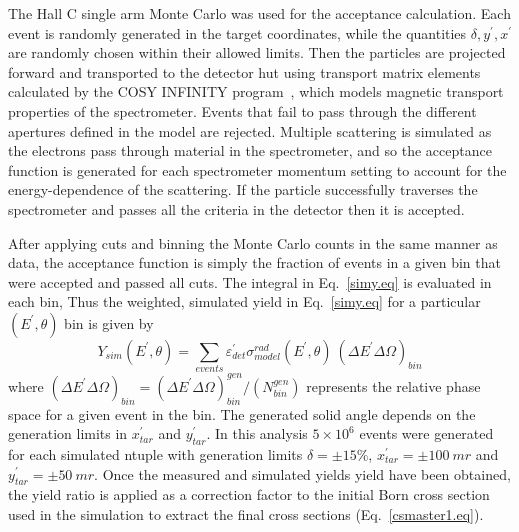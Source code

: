 


The Hall C single arm Monte Carlo was used for the acceptance calculation.
Each event is randomly generated in the target coordinates, while the
quantities $\delta, y^{'}, x^{'}$ are randomly chosen within their allowed
limits. Then the particles are projected forward and transported to the
detector hut using transport matrix elements calculated by the COSY INFINITY
program~\cite{berz_cosy}, which models magnetic transport properties of the
spectrometer. Events that fail to pass through the different apertures defined
in the model are rejected.  Multiple scattering is simulated as the electrons
pass through material in the spectrometer, and so the acceptance function
is generated for each spectrometer momentum setting to account for the
energy-dependence of the scattering. If the particle successfully traverses the
spectrometer and passes all the criteria in the detector then it is accepted.


After applying cuts and binning the Monte Carlo counts in the same manner as
data, the acceptance function is simply the fraction of events in
a given bin that were accepted and passed all cuts. The integral in
Eq.~\ref{simy.eq} is evaluated in each bin, Thus the weighted, simulated yield
in Eq.~\ref{simy.eq} for a particular $(E^{\prime},\theta)$ bin is given by
%
\begin{equation}
Y_{sim} (E^{\prime},\theta)= \sum_{events} \varepsilon^{\prime}_{det}\sigma^{rad}_{model}(E^{\prime},\theta)~(\Delta E^{\prime}\Delta \Omega)_{bin}
\end{equation}
%
where $(\Delta E^{\prime}\Delta \Omega)_{bin}=(\Delta E^{\prime}\Delta
\Omega)_{bin}^{gen}/(N_{bin}^{gen})$ represents the relative phase space for a
given event in the bin. The generated solid angle depends on the generation
limits in $x^{'}_{tar}$ and $y^{'}_{tar}$. In this analysis $5\times 10^{6}$
events were generated for each simulated ntuple with generation limits
$\delta=\pm 15\%$, $x^{'}_{tar}=\pm 100~mr$ and $y^{'}_{tar}=\pm 50~mr$.
Once the measured and simulated yields yield have been obtained, the yield
ratio is applied as a correction factor to the initial Born cross section used
in the simulation to extract the final cross sections (Eq.~\ref{csmaster1.eq}).

